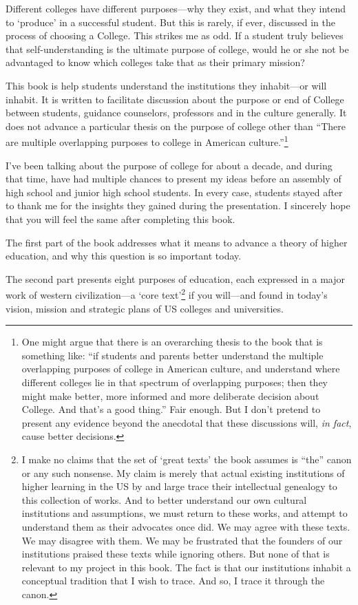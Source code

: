 Different colleges have different purposes---why they exist, and what they intend to `produce' in a successful student. But this is rarely, if ever, discussed in the process of choosing a College. This strikes me as odd. If a student truly believes that self-understanding is the ultimate purpose of college, would he or she not be advantaged to know which colleges take that as their primary mission? 

This book is help students understand the institutions they inhabit---or will inhabit. It is written to facilitate discussion about the purpose or end of College between students, guidance counselors, professors and in the culture generally. It does not advance a particular thesis on the purpose of college other than ``There are multiple overlapping purposes to college in American culture.''\footnote{One might argue that there is an overarching thesis to the book that is something like: ``if students and parents better understand the multiple overlapping purposes of college in American culture, and understand where different colleges lie in that spectrum of overlapping purposes; then they might make better, more informed and more deliberate decision about College. And that's a good thing.'' Fair enough. But I don't pretend to present any evidence beyond the anecdotal that these discussions will, \emph{in fact}, cause better decisions.}

I've been talking about the purpose of college for about a decade, and during that time, have had multiple chances to present my ideas before an assembly of high school and junior high school students. In every case, students stayed after to thank me for the insights they gained during the presentation. I sincerely hope that you will feel the same after completing this book.

The first part of the book addresses what it means to advance a theory of higher education, and why this question is so important today.

The second part presents eight purposes of education, each expressed in a major work of western civilization---a `core text'\footnote{I make no claims that the set of `great texts' the book assumes is ``the'' canon or any such nonsense. My claim is merely that actual existing institutions of higher learning in the US by and large trace their intellectual genealogy to this collection of works. And to better understand our own cultural institutions and assumptions, we must return to these works, and attempt to understand them as their advocates once did. We may agree with these texts. We may disagree with them. We may be frustrated that the founders of our institutions praised these texts while ignoring others. But none of that is relevant to my project in this book. The fact is that our institutions inhabit a conceptual tradition that I wish to trace. And so, I trace it through the canon.} if you will---and found in today's vision, mission and strategic plans of US colleges and universities.


